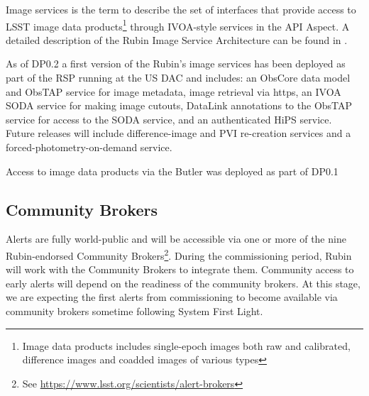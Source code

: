 Image services is the term to describe the set of interfaces that provide access to LSST image data products\footnote{Image data products includes single-epoch images both raw and calibrated, difference images and coadded images of various types} through IVOA-style services in the API Aspect. 
A detailed description of the Rubin Image Service Architecture can be found in .

As of DP0.2 a first version of the Rubin's image services has been deployed as part of the RSP running at the US DAC and includes: an ObsCore data model and ObsTAP service for image metadata, image retrieval via https, an IVOA SODA service for making image cutouts, DataLink annotations to the ObsTAP service for access to the SODA service, and an authenticated HiPS service.
Future releases will include difference-image and PVI re-creation services and a forced-photometry-on-demand service.

Access to image data products via the Butler was deployed as part of DP0.1

\subsection{Community Brokers }

Alerts are fully world-public and will be accessible via one or more of the nine Rubin-endorsed Community Brokers\footnote{See \url{https://www.lsst.org/scientists/alert-brokers}}.
During the commissioning period, Rubin will work with the Community Brokers to integrate them.  
Community access to early alerts will depend on the readiness of the community brokers. 
At this stage, we are expecting the first alerts from commissioning to become available via community brokers sometime following System First Light. 
